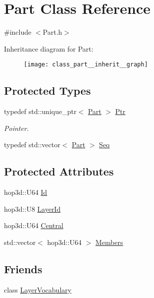 \hypertarget{class_part}{\section{Part Class Reference}
\label{class_part}
}


{\ttfamily \#include $<$Part.\-h$>$}



Inheritance diagram for Part\-:\nopagebreak
\begin{figure}[H]
\begin{center}
\leavevmode
\texttt{[image: class\_part\_\_inherit\_\_graph]}
\end{center}
\end{figure}
\subsection*{Protected Types}
\begin{DoxyCompactItemize}
\item 
typedef std\-::unique\-\_\-ptr$<$ \hyperlink{class_part}{Part} $>$ \hyperlink{class_part_a270255868bbd294da6cdbe1a22fd71c0}{Ptr}
\begin{DoxyCompactList}\small\item\em Pointer. \end{DoxyCompactList}\item 
typedef std\-::vector$<$ \hyperlink{class_part}{Part} $>$ \hyperlink{class_part_a9cbb31df0bd4615cb133293acd55a938}{Seq}
\end{DoxyCompactItemize}
\subsection*{Protected Attributes}
\begin{DoxyCompactItemize}
\item 
hop3d\-::\-U64 \hyperlink{class_part_a3d19e990ee30d25cd5f12610864300db}{Id}
\item 
hop3d\-::\-U8 \hyperlink{class_part_ac4e9f24ead3926518a74b37c5101efc0}{Layer\-Id}
\item 
hop3d\-::\-U64 \hyperlink{class_part_a1dafacbc907066c3976ca09dc69a7421}{Central}
\item 
std\-::vector$<$ hop3d\-::\-U64 $>$ \hyperlink{class_part_ad5e3891ace1e60c4b0c9b86bad225a38}{Members}
\end{DoxyCompactItemize}
\subsection*{Friends}
\begin{DoxyCompactItemize}
\item 
class \hyperlink{class_part_a89d34d14776f6667e8cf4c088578f931}{Layer\-Vocabulary}
\end{DoxyCompactItemize}


